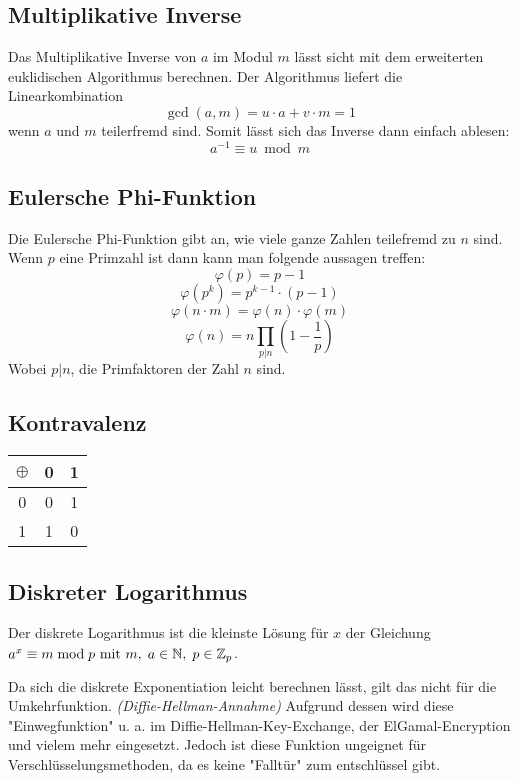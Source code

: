 \documentclass[a4paper,landscape]{article}
\begin{document}
\begin{multicols*}{4}
	\subsection{Multiplikative Inverse}
	Das Multiplikative Inverse von \(a\) im Modul \(m\) lässt sicht mit dem
	erweiterten euklidischen Algorithmus berechnen. Der Algorithmus liefert die
	Linearkombination
	\[\gcd(a,m) = u \cdot a + v \cdot m = 1\]
	wenn \(a\) und \(m\) teilerfremd sind. Somit lässt sich das Inverse dann
	einfach ablesen:
	\[a^{-1} \equiv u \bmod m\]

	\subsection{Eulersche Phi-Funktion}
	Die Eulersche Phi-Funktion gibt an, wie viele ganze Zahlen teilefremd zu
	\(n\) sind. Wenn \(p\) eine Primzahl ist dann kann man folgende aussagen
	treffen:
	\[\varphi(p) = p - 1\]
	\[\varphi(p^{k}) = p^{k-1} \cdot \left(p - 1\right)\]
	\[\varphi(n \cdot m) = \varphi(n) \cdot \varphi(m)\]
	\[\varphi(n) = n \prod_{p|n} \left(1 - \frac{1}{p}\right)\]
	Wobei \(p|n\), die Primfaktoren der Zahl \(n\) sind.


	\subsection{Kontravalenz}
	\begin{center}
		\begin{tabular}{c| c c }
			$\oplus$ & 0 & 1 \\ \hline
			0        & 0 & 1 \\
			1        & 1 & 0
		\end{tabular}
	\end{center}

	\subsection{Diskreter Logarithmus}
	Der diskrete Logarithmus ist die kleinste Lösung für \(x\) der Gleichung
	\(a^{x} \equiv m \bmod p$ mit $m,\;a \in\mathbb{N},\;p \in\mathbb{Z}_{p}\). \par
	Da sich die diskrete Exponentiation leicht berechnen lässt, gilt das nicht
	für die Umkehrfunktion. \emph{(Diffie-Hellman-Annahme)} Aufgrund dessen wird
	diese "Einwegfunktion" u. a. im Diffie-Hellman-Key-Exchange,
	der ElGamal-Encryption und vielem mehr eingesetzt. Jedoch ist diese Funktion
	ungeignet für Verschlüsselungsmethoden, da es keine "Falltür" zum
	entschlüssel gibt.


\end{multicols*}
\end{document}

